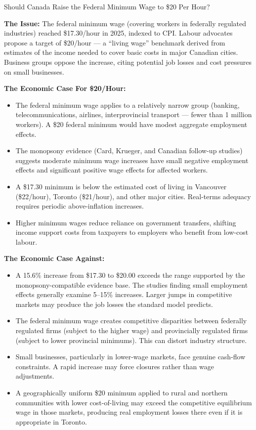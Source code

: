 \begin{policydebate}{Should Canada Raise the Federal Minimum Wage to \$20 Per Hour?}

\textbf{The Issue:} The federal minimum wage (covering workers in federally
regulated industries) reached \$17.30/hour in 2025, indexed to CPI.
Labour advocates propose a target of \$20/hour --- a ``living wage''
benchmark derived from estimates of the income needed to cover basic costs
in major Canadian cities. Business groups oppose the increase, citing
potential job losses and cost pressures on small businesses.

\textbf{The Economic Case For \$20/Hour:}
\begin{itemize}
  \item The federal minimum wage applies to a relatively narrow group
        (banking, telecommunications, airlines, interprovincial transport
        --- fewer than 1 million workers). A \$20 federal minimum would
        have modest aggregate employment effects.
  \item The monopsony evidence (Card, Krueger, and Canadian follow-up studies)
        suggests moderate minimum wage increases have small negative employment
        effects and significant positive wage effects for affected workers.
  \item A \$17.30 minimum is below the estimated cost of living in Vancouver
        (\$22/hour), Toronto (\$21/hour), and other major cities. Real-terms
        adequacy requires periodic above-inflation increases.
  \item Higher minimum wages reduce reliance on government transfers,
        shifting income support costs from taxpayers to employers who
        benefit from low-cost labour.
\end{itemize}

\textbf{The Economic Case Against:}
\begin{itemize}
  \item A 15.6\% increase from \$17.30 to \$20.00 exceeds the range
        supported by the monopsony-compatible evidence base. The studies
        finding small employment effects generally examine 5--15\% increases.
        Larger jumps in competitive markets may produce the job losses
        the standard model predicts.
  \item The federal minimum wage creates competitive disparities between
        federally regulated firms (subject to the higher wage) and provincially
        regulated firms (subject to lower provincial minimums). This can
        distort industry structure.
  \item Small businesses, particularly in lower-wage markets, face genuine
        cash-flow constraints. A rapid increase may force closures rather than
        wage adjustments.
  \item A geographically uniform \$20 minimum applied to rural and
        northern communities with lower cost-of-living may exceed the
        competitive equilibrium wage in those markets, producing real
        employment losses there even if it is appropriate in Toronto.
\end{itemize}


\end{policydebate}
